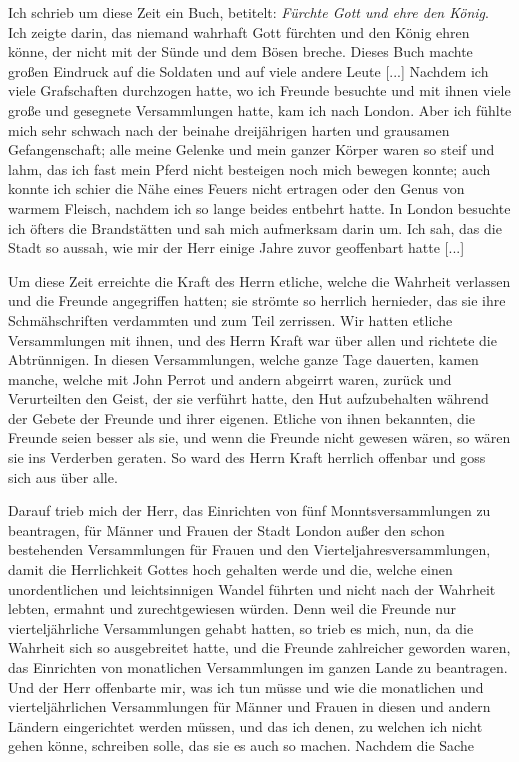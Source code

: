 Ich schrieb um diese Zeit ein Buch, betitelt: \textit{Fürchte Gott
und ehre den König}. Ich zeigte darin, das niemand wahrhaft
Gott fürchten und den König ehren könne, der nicht mit der Sünde
und dem Bösen breche. Dieses Buch machte großen Eindruck
auf die Soldaten und auf viele andere Leute [...]
Nachdem ich viele Grafschaften durchzogen hatte, wo ich
Freunde besuchte und mit ihnen viele große und gesegnete 
Versammlungen hatte, kam ich nach London. Aber ich fühlte mich
sehr schwach nach der beinahe dreijährigen harten und grausamen
Gefangenschaft; alle meine Gelenke und mein ganzer Körper waren
so steif und lahm, das ich fast mein Pferd nicht besteigen noch
mich bewegen konnte; auch konnte ich schier die Nähe eines Feuers
nicht ertragen oder den Genus von warmem Fleisch, nachdem ich
so lange beides entbehrt hatte. In London besuchte ich öfters
die Brandstätten und sah mich aufmerksam darin um. Ich sah,
das die Stadt so aussah, wie mir der Herr einige Jahre zuvor
geoffenbart hatte [...]

Um diese Zeit erreichte die Kraft des Herrn etliche, welche
die Wahrheit verlassen und die Freunde angegriffen hatten; sie
strömte so herrlich hernieder, das sie ihre Schmähschriften verdammten 
und zum Teil zerrissen. Wir hatten etliche Versammlungen 
mit ihnen, und des Herrn Kraft war über allen und richtete
die Abtrünnigen. In diesen Versammlungen, welche ganze Tage
dauerten, kamen manche, welche 
mit John Perrot und andern
abgeirrt waren, zurück und Verurteilten den Geist, der sie verführt
hatte, den Hut aufzubehalten während der Gebete der Freunde
und ihrer eigenen. Etliche von ihnen bekannten, die Freunde
seien besser als sie, und wenn die Freunde nicht gewesen wären,
so wären sie ins Verderben geraten. So ward des Herrn Kraft
herrlich offenbar und goss sich aus über alle.

Darauf trieb mich der Herr, das Einrichten von fünf 
Monntsversammlungen zu beantragen, 
für Männer und Frauen der
Stadt London außer den schon bestehenden Versammlungen für
Frauen und den Vierteljahresversammlungen, 
damit die Herrlichkeit Gottes hoch gehalten werde und die, welche einen 
unordentlichen und leichtsinnigen Wandel führten und nicht nach der 
Wahrheit lebten, ermahnt und zurechtgewiesen würden. Denn weil
die Freunde nur vierteljährliche Versammlungen gehabt hatten, so
trieb es mich, nun, da die Wahrheit sich so ausgebreitet hatte,
und die Freunde zahlreicher geworden waren, das Einrichten von
monatlichen Versammlungen im ganzen Lande zu beantragen.
Und der Herr offenbarte mir, was ich tun müsse und wie die
monatlichen und vierteljährlichen Versammlungen für Männer
und Frauen in diesen und andern Ländern eingerichtet werden
müssen, und das ich denen, zu welchen ich nicht gehen könne,
schreiben solle, das sie es auch so machen. Nachdem die Sache